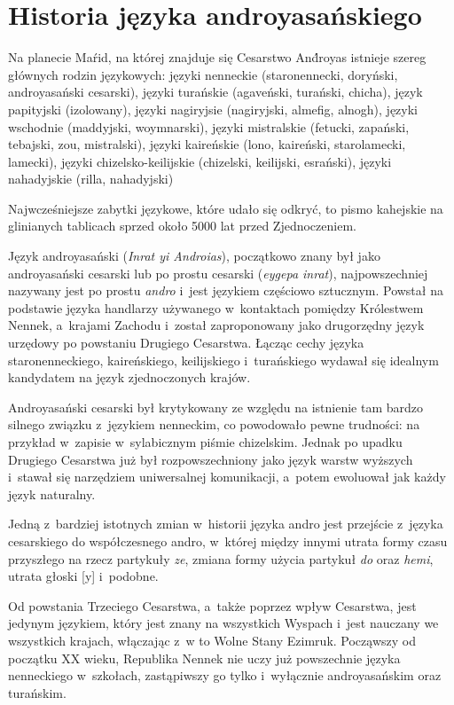 \section[Historia]{Historia języka androyasańskiego}

\begin{spacing}{1.1}
Na planecie Maŕid, na której znajduje się Cesarstwo And́royas istnieje szereg 
głównych rodzin językowych: języki nenneckie (staronennecki, doryński, 
androyasański cesarski), języki turańskie (agaveński, turański, chicha), język 
papityjski (izolowany), języki nagiryjsie (nagiryjski, almefig, alnogh), 
języki wschodnie (maddyjski, woymnarski), języki mistralskie (fetucki, zapański, 
tebajski, zou, mistralski), języki kaireńskie (lono, kaireński, starolamecki, 
lamecki), języki chi\-zelsko-keilijskie (chizelski, keilijski, esrański), języki 
nahadyjskie (rilla, nahadyjski)

Najwcześniejsze zabytki językowe, które udało się odkryć, to pismo kahejskie na 
glinianych tablicach sprzed około 5000 lat przed Zjednoczeniem.

Język androyasański (\emph{Inrat yi Androias}), początkowo znany był jako 
androyasański cesarski lub po prostu cesarski (\emph{eygepa inrat}), 
najpowszechniej nazywany jest po prostu \emph{andro} i~jest językiem częściowo 
sztucznym. Powstał na podstawie języka handlarzy używanego w~kontaktach pomiędzy 
Królestwem Nennek, a~krajami Zachodu i~został zaproponowany jako drugorzędny 
język urzędowy po powstaniu Drugiego Cesarstwa. Łącząc cechy języka 
staronenneckiego, kaireńskiego, keilijskiego i~turańskiego wydawał się idealnym 
kandydatem na język zjednoczonych krajów.

Androyasański cesarski był krytykowany ze względu na istnienie tam bardzo 
silnego związku z~językiem nenneckim, co powodowało pewne trudności: na przykład 
w~zapisie w~sylabicznym piśmie chizelskim. Jednak po upadku Drugiego Cesarstwa 
już był rozpowszechniony jako język warstw wyższych i~stawał się narzędziem 
uniwersalnej komunikacji, a~potem ewoluował jak każdy język naturalny.

Jedną z~bardziej istotnych zmian w~historii języka andro jest przejście z~języka
cesarskiego do współczesnego andro, w~której między innymi utrata formy czasu
przyszłego na rzecz partykuły \emph{ze}, zmiana formy użycia partykuł \emph{do}
oraz \emph{hemi}, utrata głoski [y] i~podobne.

Od powstania Trzeciego Cesarstwa, a~także poprzez wpływ Cesarstwa, jest jedynym 
językiem, który jest znany na wszystkich Wyspach i~jest nauczany we wszystkich 
krajach, włączając z~w to Wolne Stany Ezimruk. Począwszy od początku XX wieku, 
Republika Nennek nie uczy już powszechnie języka nenneckiego w~szkołach, 
zastąpiwszy go tylko i~wyłącznie androyasańskim oraz turańskim.


\end{spacing}
